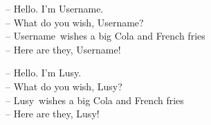 \documentclass{article}
\newcommand{\deflName}{Username}
\newcommand{\lName}[1]{\renewcommand{\deflName}{#1}}
\newcommand{\generate}{
        -- Hello. I'm \deflName.\\
        -- What do you wish, \deflName?\\
        -- \deflName\ wishes a big Cola and French fries\\
        -- Here are they, \deflName! \\
        }
\begin{document}
    \vspace*{\fill}\vspace{-5ex}
    \generate 

    \lName{Lusy}
    \generate

    
    \vspace*{\fill}
\end{document}
